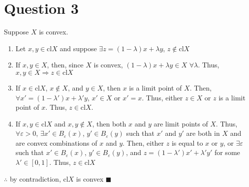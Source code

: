 \documentclass{article}
\newcommand{\cl}[1]{\text{cl}#1}
\begin{document}
\section*{Question 3}
Suppose $X$ is convex.
\begin{enumerate}
	\item Let $x,y\in\cl{X}$ and suppose $\exists z=(1-\lambda)x + \lambda y$, $z\notin\cl{X}$
	\item If $x,y\in X$, then, since $X$ is convex, $(1-\lambda)x + \lambda y\in X$ $\forall \lambda$. Thus, $x,y\in X\Rightarrow z\in\cl{X}$
	\item If $x\in\cl{X}$, $x\notin X$, and $y\in X$, then $x$ is a limit point of $X$. Then, $\forall x'=(1-\lambda')x + \lambda'y$, $x'\in X$ or $x'=x$. Thus, either $z\in X$ or $z$ is a limit point of $x$. Thus, $z\in\cl{X}$.
	\item If $x,y\in\cl{X}$ and $x,y\notin X$, then both $x$ and $y$ are limit points of $X$. Thus, $\forall\varepsilon>0$, $\exists x'\in B_\varepsilon(x)$, $y'\in B_\varepsilon(y)$ such that $x'$ and $y'$ are both in $X$ and are convex combinations of $x$ and $y$. Then, either $z$ is equal to $x$ or $y$, or $\exists\varepsilon$ such that $x'\in B_\varepsilon(x)$, $y'\in B_\varepsilon(y)$, and $z=(1-\lambda')x'+\lambda'y'$ for some $\lambda'\in[0,1]$. Thus, $z\in\cl{X}$
\end{enumerate}
$\therefore$ by contradiction, $\cl{X}$ is convex $\blacksquare$


\end{document}
